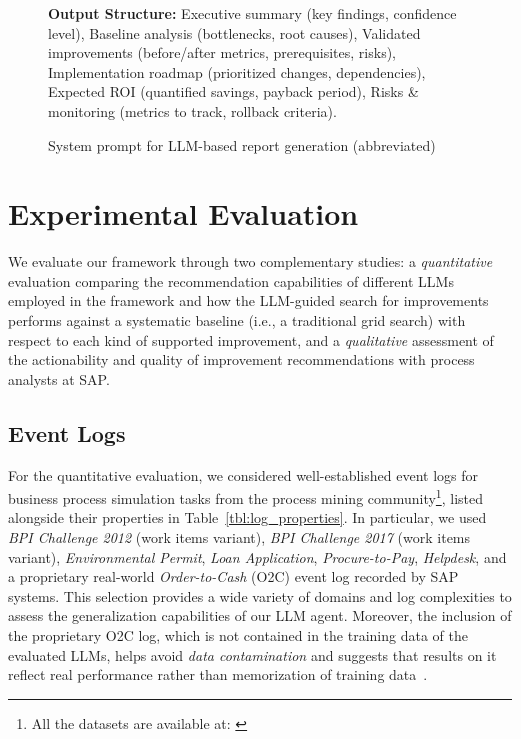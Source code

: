 \documentclass[preprint,12pt]{elsarticle}
\begin{document}
\begin{figure}[!t]
\begin{tcolorbox}[
    title=System Prompt: Report Generation,
    colframe=black!80,
    fonttitle=\bfseries,
    boxsep=2pt, left=5pt, right=5pt, top=1mm, bottom=1mm,
    toptitle=0.5mm, bottomtitle=0.5mm
]
    \begin{tcolorbox}[colback=outputcolor, colframe=white, boxrule=0pt,
        size=fbox, arc=0mm,
        before skip=0pt, after skip=0pt]
        \textbf{Output Structure:} Executive summary (key findings, confidence level), Baseline analysis (bottlenecks, root causes), Validated improvements (before/after metrics, prerequisites, risks), Implementation roadmap (prioritized changes, dependencies), Expected ROI (quantified savings, payback period), Risks \& monitoring (metrics to track, rollback criteria).
    \end{tcolorbox}
\end{tcolorbox}
\caption{System prompt for LLM-based report generation (abbreviated)}
\label{fig:report-prompt}
\end{figure}

\section{Experimental Evaluation}
\label{sec:evaluation}

We evaluate our framework through two complementary studies: a \textit{quantitative} evaluation comparing the recommendation capabilities of different LLMs employed in the framework and how the LLM-guided search for improvements performs against a systematic baseline (i.e., a traditional grid search) with respect to each kind of supported improvement, and a \textit{qualitative} assessment of the actionability and quality of improvement recommendations with process analysts at SAP.

\subsection{Event Logs}
\label{sec:logs}
For the quantitative evaluation, we considered well-established event logs for business process simulation tasks from the process mining community\footnote{All the datasets are available at: \url{}}, listed alongside their properties in Table~\ref{tbl:log_properties}. In particular, we used \textit{BPI Challenge 2012} (work items variant), \textit{BPI Challenge 2017} (work items variant), \textit{Environmental Permit}, \textit{Loan Application}, \textit{Procure-to-Pay}, \textit{Helpdesk}, and a proprietary real-world \textit{Order-to-Cash} (O2C) event log recorded by SAP systems. This selection provides a wide variety of domains and log complexities to assess the generalization capabilities of our LLM agent. Moreover, the inclusion of the proprietary O2C log, which is not contained in the training data of the evaluated LLMs, helps avoid \textit{data contamination} and suggests that results on it reflect real performance rather than memorization of training data~\citep{DBLP:conf/uss/CarliniTWJHLRBS21}.
\end{document}
